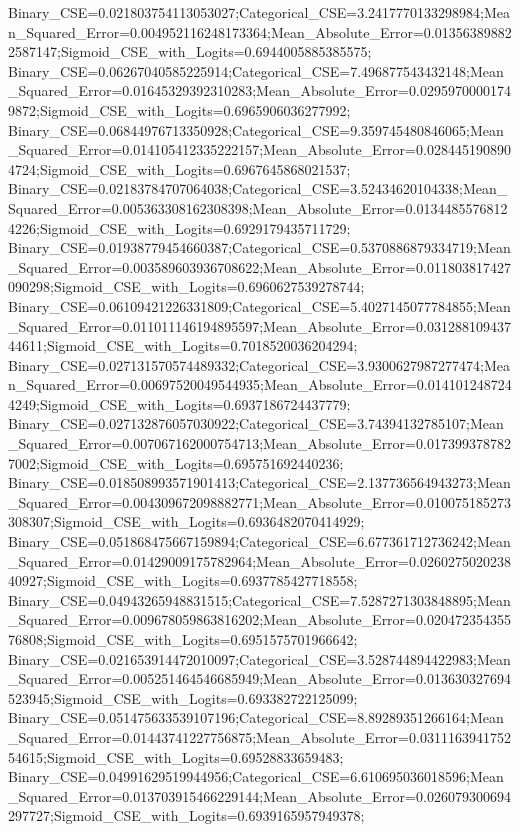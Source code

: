 Binary_CSE=0.021803754113053027;Categorical_CSE=3.2417770133298984;Mean_Squared_Error=0.004952116248173364;Mean_Absolute_Error=0.013563898822587147;Sigmoid_CSE_with_Logits=0.6944005885385575;
Binary_CSE=0.06267040585225914;Categorical_CSE=7.496877543432148;Mean_Squared_Error=0.01645329392310283;Mean_Absolute_Error=0.02959700001749872;Sigmoid_CSE_with_Logits=0.6965906036277992;
Binary_CSE=0.06844976713350928;Categorical_CSE=9.359745480846065;Mean_Squared_Error=0.014105412335222157;Mean_Absolute_Error=0.0284451908904724;Sigmoid_CSE_with_Logits=0.6967645868021537;
Binary_CSE=0.02183784707064038;Categorical_CSE=3.52434620104338;Mean_Squared_Error=0.005363308162308398;Mean_Absolute_Error=0.01344855768124226;Sigmoid_CSE_with_Logits=0.6929179435711729;
Binary_CSE=0.01938779454660387;Categorical_CSE=0.5370886879334719;Mean_Squared_Error=0.003589603936708622;Mean_Absolute_Error=0.011803817427090298;Sigmoid_CSE_with_Logits=0.6960627539278744;
Binary_CSE=0.06109421226331809;Categorical_CSE=5.4027145077784855;Mean_Squared_Error=0.011011146194895597;Mean_Absolute_Error=0.03128810943744611;Sigmoid_CSE_with_Logits=0.7018520036204294;
Binary_CSE=0.027131570574489332;Categorical_CSE=3.9300627987277474;Mean_Squared_Error=0.00697520049544935;Mean_Absolute_Error=0.0141012487244249;Sigmoid_CSE_with_Logits=0.6937186724437779;
Binary_CSE=0.027132876057030922;Categorical_CSE=3.74394132785107;Mean_Squared_Error=0.007067162000754713;Mean_Absolute_Error=0.0173993787827002;Sigmoid_CSE_with_Logits=0.695751692440236;
Binary_CSE=0.018508993571901413;Categorical_CSE=2.137736564943273;Mean_Squared_Error=0.004309672098882771;Mean_Absolute_Error=0.010075185273308307;Sigmoid_CSE_with_Logits=0.6936482070414929;
Binary_CSE=0.051868475667159894;Categorical_CSE=6.677361712736242;Mean_Squared_Error=0.01429009175782964;Mean_Absolute_Error=0.026027502023840927;Sigmoid_CSE_with_Logits=0.6937785427718558;
Binary_CSE=0.04943265948831515;Categorical_CSE=7.5287271303848895;Mean_Squared_Error=0.009678059863816202;Mean_Absolute_Error=0.02047235435576808;Sigmoid_CSE_with_Logits=0.6951575701966642;
Binary_CSE=0.021653914472010097;Categorical_CSE=3.528744894422983;Mean_Squared_Error=0.005251464546685949;Mean_Absolute_Error=0.013630327694523945;Sigmoid_CSE_with_Logits=0.693382722125099;
Binary_CSE=0.051475633539107196;Categorical_CSE=8.89289351266164;Mean_Squared_Error=0.01443741227756875;Mean_Absolute_Error=0.031116394175254615;Sigmoid_CSE_with_Logits=0.69528833659483;
Binary_CSE=0.04991629519944956;Categorical_CSE=6.610695036018596;Mean_Squared_Error=0.013703915466229144;Mean_Absolute_Error=0.026079300694297727;Sigmoid_CSE_with_Logits=0.6939165957949378;
